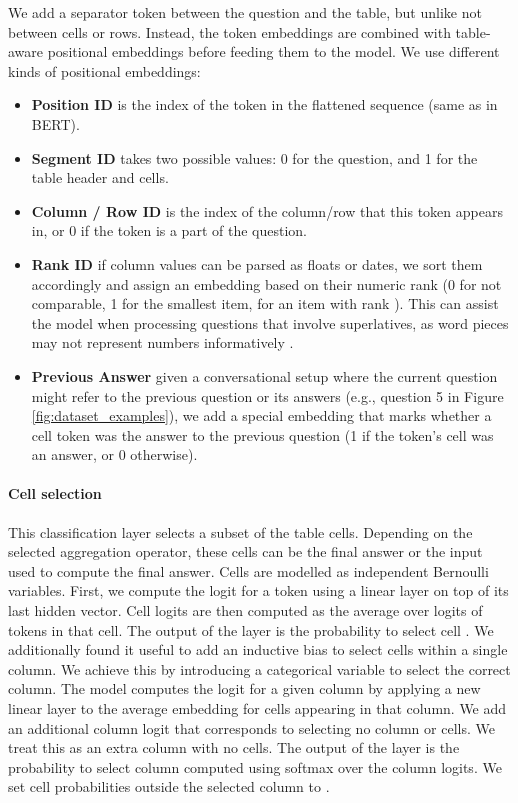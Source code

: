 \documentclass[11pt,a4paper]{article}
\begin{document}
We add a separator token between the question and the table, but unlike  not between cells or rows. Instead, the token embeddings are combined with table-aware positional embeddings before feeding them to the model. We use different kinds of positional embeddings:

\begin{itemize}[leftmargin=*,itemsep=0pt]
    \item \textbf{Position ID} is the index of the token in the flattened sequence (same as in BERT).
    \item \textbf{Segment ID} takes two possible values: 0 for the question, and 1 for the table header and cells.
    \item \textbf{Column / Row ID} is the index of the column/row that this token appears in, or 0 if the token is a part of the question.
    \item \textbf{Rank ID} if column values can be parsed as floats or dates, we sort them accordingly and assign an embedding based on their numeric rank (0 for not comparable, 1 for the smallest item,  for an item with rank ). This can assist the model when processing questions that involve superlatives, as word pieces may not represent numbers informatively \cite{wallace2019nlp}.
    \item \textbf{Previous Answer} given a conversational setup where the current question might refer to the previous question or its answers (e.g., question 5 in Figure \ref{fig:dataset_examples}), we add a special embedding that marks whether a cell token was the answer to the previous question (1 if the token's cell was an answer, or 0 otherwise).
\end{itemize}

\paragraph{Cell selection}
This classification layer selects a subset of the table cells. Depending on the selected aggregation operator, these cells can be the final answer or the input used to compute the final answer.
Cells are modelled as independent Bernoulli variables. First, we compute the logit for a token using a linear layer on top of its last hidden vector. Cell logits are then computed as the average over logits of tokens in that cell. The output of the layer is the probability  to select cell .
We additionally found it useful to add an inductive bias to select cells within a single column. We achieve this by introducing a categorical variable to select the correct column. The model computes the logit for a given column by applying a new linear layer to the average embedding for cells appearing in that column. We add an additional column logit that corresponds to selecting no column or cells. We treat this as an extra column with no cells. The output of the layer is the probability  to select column  computed using softmax over the column logits. We set cell probabilities  outside the selected column to .
\end{document}
